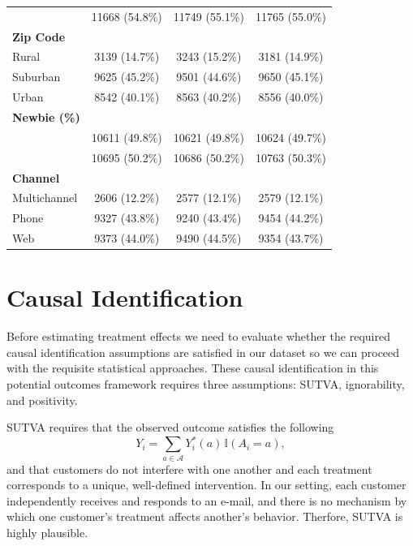 \documentclass[10pt]{article}
\begin{document}
\begin{table}[H]
\begin{tabular}{lccc}
\quad 1 
& 11668 (54.8\%) 
& 11749 (55.1\%) 
& 11765 (55.0\%) \\

\textbf{Zip Code} & & & \\

\quad Rural 
& 3139 (14.7\%) 
& 3243 (15.2\%) 
& 3181 (14.9\%) \\

\quad Suburban 
& 9625 (45.2\%) 
& 9501 (44.6\%) 
& 9650 (45.1\%) \\

\quad Urban 
& 8542 (40.1\%) 
& 8563 (40.2\%) 
& 8556 (40.0\%) \\

\textbf{Newbie (\%)} & & & \\

\quad 0 
& 10611 (49.8\%) 
& 10621 (49.8\%) 
& 10624 (49.7\%) \\

\quad 1 
& 10695 (50.2\%) 
& 10686 (50.2\%) 
& 10763 (50.3\%) \\

\textbf{Channel} & & & \\

\quad Multichannel 
& 2606 (12.2\%) 
& 2577 (12.1\%) 
& 2579 (12.1\%) \\

\quad Phone 
& 9327 (43.8\%) 
& 9240 (43.4\%) 
& 9454 (44.2\%) \\

\quad Web 
& 9373 (44.0\%) 
& 9490 (44.5\%) 
& 9354 (43.7\%) \\

\bottomrule
\end{tabular}
\end{table}


\section{Causal Identification}

Before estimating treatment effects we need to evaluate whether the required causal identification assumptions are satisfied in our dataset so we can proceed with the requisite statistical approaches. These causal identification in this potential outcomes framework requires three assumptions: SUTVA, ignorability, and positivity.

SUTVA requires that the observed outcome satisfies the following
\[
Y_i = \sum_{a \in \mathcal{A}} Y_i^\ast(a)\,\mathbb{I}(A_i = a),
\]
and that customers do not interfere with one another and each treatment corresponds to a unique, well-defined intervention. In our setting, each customer independently receives and responds to an e-mail, and there is no mechanism by which one customer's treatment affects another's behavior. Therfore, SUTVA is highly plausible.
\end{document}
